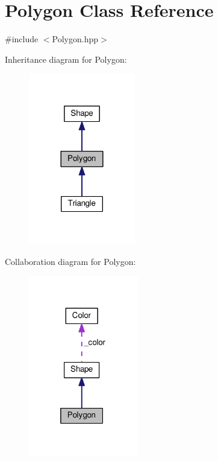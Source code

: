 \hypertarget{class_polygon}{}\section{Polygon Class Reference}
\label{class_polygon}


{\ttfamily \#include $<$Polygon.\+hpp$>$}



Inheritance diagram for Polygon\+:\nopagebreak
\begin{figure}[H]
\begin{center}
\leavevmode
\includegraphics[width=132pt]{class_polygon__inherit__graph}
\end{center}
\end{figure}


Collaboration diagram for Polygon\+:\nopagebreak
\begin{figure}[H]
\begin{center}
\leavevmode
\includegraphics[width=136pt]{class_polygon__coll__graph}
\end{center}
\end{figure}
